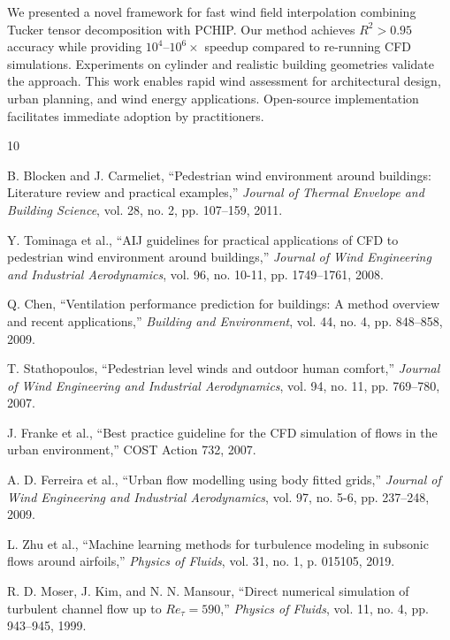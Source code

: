 \documentclass[conference]{IEEEtran}
\begin{document}
We presented a novel framework for fast wind field interpolation combining Tucker tensor decomposition with PCHIP. Our method achieves $R^2 > 0.95$ accuracy while providing $10^4$--$10^6\times$ speedup compared to re-running CFD simulations. Experiments on cylinder and realistic building geometries validate the approach. This work enables rapid wind assessment for architectural design, urban planning, and wind energy applications. Open-source implementation facilitates immediate adoption by practitioners.

\begin{thebibliography}{10}

B. Blocken and J. Carmeliet, ``Pedestrian wind environment around buildings: Literature review and practical examples,'' \textit{Journal of Thermal Envelope and Building Science}, vol. 28, no. 2, pp. 107--159, 2011.

Y. Tominaga et al., ``AIJ guidelines for practical applications of CFD to pedestrian wind environment around buildings,'' \textit{Journal of Wind Engineering and Industrial Aerodynamics}, vol. 96, no. 10-11, pp. 1749--1761, 2008.

Q. Chen, ``Ventilation performance prediction for buildings: A method overview and recent applications,'' \textit{Building and Environment}, vol. 44, no. 4, pp. 848--858, 2009.

T. Stathopoulos, ``Pedestrian level winds and outdoor human comfort,'' \textit{Journal of Wind Engineering and Industrial Aerodynamics}, vol. 94, no. 11, pp. 769--780, 2007.

J. Franke et al., ``Best practice guideline for the CFD simulation of flows in the urban environment,'' COST Action 732, 2007.

A. D. Ferreira et al., ``Urban flow modelling using body fitted grids,'' \textit{Journal of Wind Engineering and Industrial Aerodynamics}, vol. 97, no. 5-6, pp. 237--248, 2009.

L. Zhu et al., ``Machine learning methods for turbulence modeling in subsonic flows around airfoils,'' \textit{Physics of Fluids}, vol. 31, no. 1, p. 015105, 2019.

R. D. Moser, J. Kim, and N. N. Mansour, ``Direct numerical simulation of turbulent channel flow up to $Re_\tau = 590$,'' \textit{Physics of Fluids}, vol. 11, no. 4, pp. 943--945, 1999.


\end{thebibliography}
\end{document}
